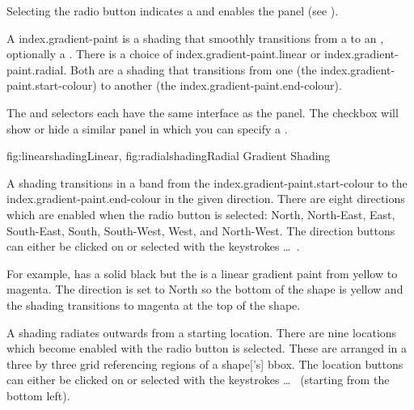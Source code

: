Selecting the  radio button indicates a 
 and enables the
 panel (see
). 

A \gls{index.gradient-paint} is a shading that smoothly transitions
from a  to an
, optionally
 a .  There is a choice
of \gls{index.gradient-paint.linear} or
\gls{index.gradient-paint.radial}. Both are a shading that
transitions from one  (the
\gls{index.gradient-paint.start-colour}) to another (the
\gls{index.gradient-paint.end-colour}). 

The  and  selectors
each have the same interface as the  panel.
The  checkbox will show or hide
a similar panel in which you can specify a
.

{
 {fig:linearshading}{}{Linear},
 {fig:radialshading}{}{Radial}
}
{Gradient Shading}


A  shading transitions in
a band from the \gls{index.gradient-paint.start-colour} to the
\gls{index.gradient-paint.end-colour} in the given direction. There
are eight directions which are enabled when the
 radio button is selected: North, North-East,
East, South-East, South, South-West, West, and North-West.  The
direction buttons can either be clicked on or selected with the
keystrokes  \ldots\
.

For example,  has a solid black
 but the  is a linear
gradient paint from yellow to magenta. The direction is set to North
so the bottom of the shape is yellow and the shading transitions to
magenta at the top of the shape.


A  shading radiates
outwards from a starting location. There are nine locations which
become enabled with the \widget{paintselector.radial} radio button is
selected. These are arranged in a three by three grid referencing
regions of a \gls*{shape}['s] \gls{bbox}.
The location buttons can either be clicked on or
selected with the keystrokes  \ldots\
 (starting from the bottom left).

